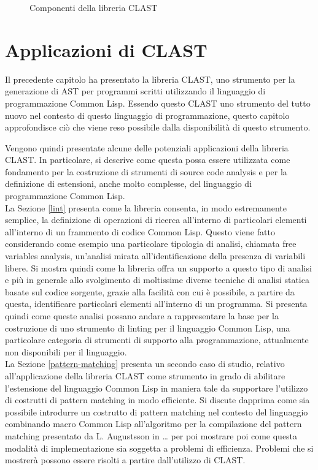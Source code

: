 \documentclass{book}
\newcommand{\image}[4]{
  \begin{figure}[H]
  \makebox[\textwidth][c]{
    \texttt{[image: \#1]}
  }
  \caption{#2}
  \label{#3}
  \end{figure}
}
\begin{document}
\image{img/clast-architecture.png}
      {Componenti della libreria CLAST}
      {fig:clast-architecture}
      {0.5}





\endgroup

\begingroup
\let\clearpage\relax

\chapter{Applicazioni di CLAST}
\label{applications}

Il precedente capitolo ha presentato la libreria CLAST, uno strumento per la
generazione di AST per programmi scritti utilizzando il linguaggio di
programmazione Common Lisp. Essendo questo CLAST uno strumento del tutto nuovo
nel contesto di questo linguaggio di programmazione, questo capitolo
approfondisce ciò che viene reso possibile dalla disponibilità di questo
strumento.

Vengono quindi presentate alcune delle potenziali applicazioni della libreria
CLAST. In particolare, si descrive come questa possa essere utilizzata come
fondamento per la costruzione di strumenti di source code analysis e per la
definizione di estensioni, anche molto complesse, del linguaggio di
programmazione Common Lisp.\\

La Sezione \ref{lint} presenta come la libreria consenta, in modo estremamente
semplice, la definizione di operazioni di ricerca all’interno di particolari
elementi all’interno di un frammento di codice Common Lisp. Questo viene fatto
considerando come esempio una particolare tipologia di analisi, chiamata free
variables analysis, un’analisi mirata all’identificazione della presenza di
variabili libere. Si mostra quindi come la libreria offra un supporto a questo
tipo di analisi e più in generale allo svolgimento di moltissime diverse
tecniche di analisi statica basate sul codice sorgente, grazie alla facilità con
cui è possibile, a partire da questa, identificare particolari elementi
all’interno di un programma. Si presenta quindi come queste analisi possano
andare a rappresentare la base per la costruzione di uno strumento di linting
per il linguaggio Common Lisp, una particolare categoria di strumenti di
supporto alla programmazione, attualmente non disponibili per il linguaggio.\\

La Sezione \ref{pattern-matching} presenta un secondo caso di studio, relativo
all’applicazione della libreria CLAST come strumento in grado di abilitare
l’estensione del linguaggio Common Lisp in maniera tale da supportare l’utilizzo
di costrutti di pattern matching in modo efficiente. Si discute dapprima come
sia possibile introdurre un costrutto di pattern matching nel contesto del
linguaggio combinando macro Common Lisp all’algoritmo per la compilazione del
pattern matching presentato da L. Augustsson in … per poi mostrare poi come
questa modalità di implementazione sia soggetta a problemi di efficienza.
Problemi che si mostrerà possono essere risolti a partire dall'utilizzo di
CLAST.\\
\end{document}
